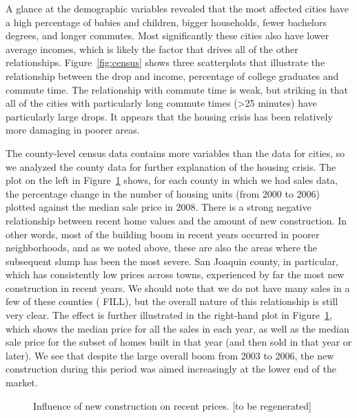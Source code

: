 \documentclass[oneside]{article}
\begin{document}
A glance at the demographic variables revealed that the most affected cities have a high percentage of babies and children, bigger households, fewer bachelors degrees, and longer commutes.  Most significantly these cities also have lower average incomes, which is likely the factor that drives all of the other relationships. Figure~\ref{fig:census} shows three scatterplots that illustrate the relationship between the drop and income, percentage of college graduates and commute time.  The relationship with commute time is weak, but striking in that all of the cities with particularly long commute times (>25 minutes) have particularly large drops. It appears that the housing crisis has been relatively more damaging in poorer areas.

The county-level census data contains more variables than the data for cities, so we analyzed the county data for further explanation of the housing crisis. The plot on the left in Figure~\ref{fig:newconstruct} shows, for each county in which we had sales data, the percentage change in the number of housing units (from 2000 to 2006) plotted against the median sale price in 2008. There is a strong negative relationship between recent home values and the amount of new construction. In other words, most of the building boom in recent years occurred in poorer neighborhoods, and as we noted above, these are also the areas where the subsequent slump has been the most severe. San Joaquin county, in particular, which has consistently low prices across towns, experienced by far the most new construction in recent years.  We should note that we do not have many sales in a few of these counties ( FILL), but the overall nature of this relationship is still very clear. The effect is further illustrated in the right-hand plot in Figure~\ref{fig:newconstruct}, which shows the median price for all the sales in each year, as well as the median sale price for the subset of homes built in that year (and then sold in that year or later). We see that despite the large overall boom from 2003 to 2006, the new construction during this period was aimed increasingly at the lower end of the market.  

\begin{figure}[htbp]
  \centering
  \caption{Influence of new construction on recent prices. [to be regenerated]}
  \label{fig:newconstruct}
\end{figure}
\end{document}
